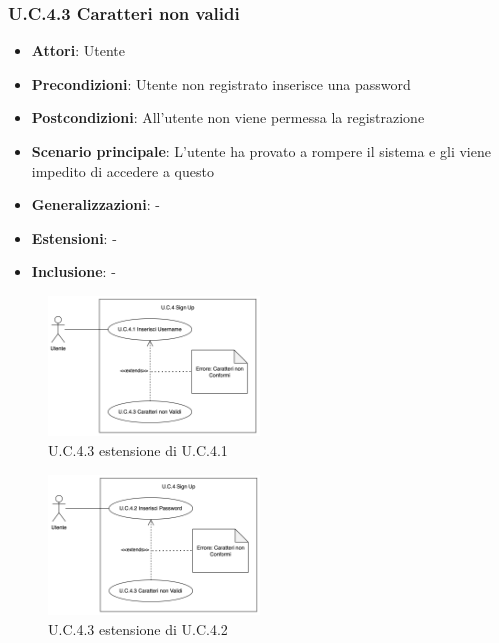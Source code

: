 \subsubsection{U.C.4.3 Caratteri non validi}
\begin{itemize}
    \item \textbf{Attori}: Utente
    \item \textbf{Precondizioni}: Utente non registrato inserisce una password
    \item \textbf{Postcondizioni}: All'utente non viene permessa la registrazione
    \item \textbf{Scenario principale}: L'utente ha provato a rompere il sistema e gli viene impedito di accedere a questo
    \item \textbf{Generalizzazioni}: -
    \item \textbf{Estensioni}: -
    \item \textbf{Inclusione}: -
\end{itemize}
\begin{figure}[h!]
    \centering
    \includegraphics[width=0.5\textwidth]{img/UC4-3.png}
    \caption{U.C.4.3 estensione di U.C.4.1}
\end{figure}
\begin{figure}[h!]
    \centering
    \includegraphics[width=0.5\textwidth]{img/UC4-3-2.png}
    \caption{U.C.4.3 estensione di U.C.4.2}
\end{figure}
